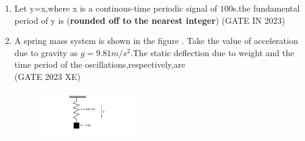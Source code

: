 \begin{enumerate}[label=\thechapter.\arabic*,ref=\thechapter.\theenumi]
\item Let y=x,where x is a continous-time periodic signal of $100$s.the fundamental period of y is (\textbf{rounded off to the nearest integer})
 \hfill(GATE IN 2023)\\
\solution
\item  A spring mass system is shown in the figure . Take the value of acceleration  due to gravity as $g=9.81m/s^2$.The static deflection due to weight and the time period of the oscillations,respectively,are\\\hfill{(GATE 2023 XE)}
 \begin{figure}[h!]
    \centering
    \includegraphics[width=0.4\textwidth]{2023/XE/71/figs/fig1.jpg}
\end{figure}
\solution
\end{enumerate}
